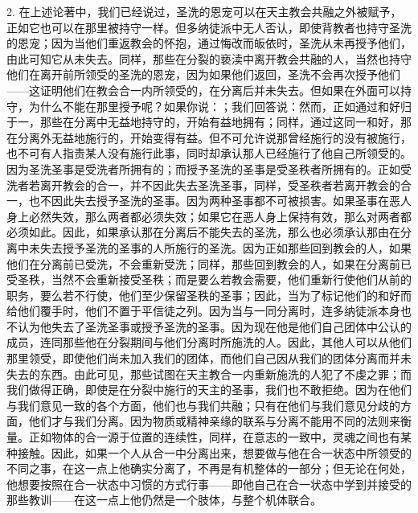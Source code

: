 2. 在上述论著中，我们已经说过，圣洗的恩宠可以在天主教会共融之外被赋予，正如它也可以在那里被持守一样。但多纳徒派中无人否认，即使背教者也持守圣洗的恩宠；因为当他们重返教会的怀抱，通过悔改而皈依时，圣洗从未再授予他们，由此可知它从未失去。同样，那些在分裂的亵渎中离开教会共融的人，当然也持守他们在离开前所领受的圣洗的恩宠，因为如果他们返回，圣洗不会再次授予他们——这证明他们在教会合一内所领受的，在分离后并未失去。但如果在外面可以持守，为什么不能在那里授予呢？如果你说：；我们回答说：然而，正如通过和好归于一，那些在分离中无益地持守的，开始有益地拥有；同样，通过这同一和好，那在分离外无益地施行的，开始变得有益。但不可允许说那曾经施行的没有被施行，也不可有人指责某人没有施行此事，同时却承认那人已经施行了他自己所领受的。因为圣洗圣事是受洗者所拥有的；而授予圣洗的圣事是受圣秩者所拥有的。正如受洗者若离开教会的合一，并不因此失去圣洗圣事，同样，受圣秩者若离开教会的合一，也不因此失去授予圣洗的圣事。因为两种圣事都不可被损害。如果圣事在恶人身上必然失效，那么两者都必须失效；如果它在恶人身上保持有效，那么对两者都必须如此。因此，如果承认那在分离后不能失去的圣洗，那么也必须承认那由在分离中未失去授予圣洗的圣事的人所施行的圣洗。因为正如那些回到教会的人，如果他们在分离前已受洗，不会重新受洗；同样，那些回到教会的人，如果在分离前已受圣秩，当然不会重新接受圣秩；而是要么若教会需要，他们重新行使他们从前的职务，要么若不行使，他们至少保留圣秩的圣事；因此，当为了标记他们的和好而给他们覆手时，他们不置于平信徒之列。因为当与一同分离时，连多纳徒派本身也不认为他失去了圣洗圣事或授予圣洗的圣事。因为现在他是他们自己团体中公认的成员，连同那些他在分裂期间与他们分离时所施洗的人。因此，其他人可以从他们那里领受，即使他们尚未加入我们的团体，而他们自己因从我们的团体分离而并未失去的东西。由此可见，那些试图在天主教合一内重新施洗的人犯了不虔之罪；而我们做得正确，即使是在分裂中施行的天主的圣事，我们也不敢拒绝。因为在他们与我们意见一致的各个方面，他们也与我们共融；只有在他们与我们意见分歧的方面，他们才与我们分离。因为物质或精神亲缘的联系与分离不能用不同的法则来衡量。正如物体的合一源于位置的连续性，同样，在意志的一致中，灵魂之间也有某种接触。因此，如果一个人从合一中分离出来，想要做与他在合一状态中所领受的不同之事，在这一点上他确实分离了，不再是有机整体的一部分；但无论在何处，他想要按照在合一状态中习惯的方式行事——即他自己在合一状态中学到并接受的那些教训——在这一点上他仍然是一个肢体，与整个机体联合。\par


